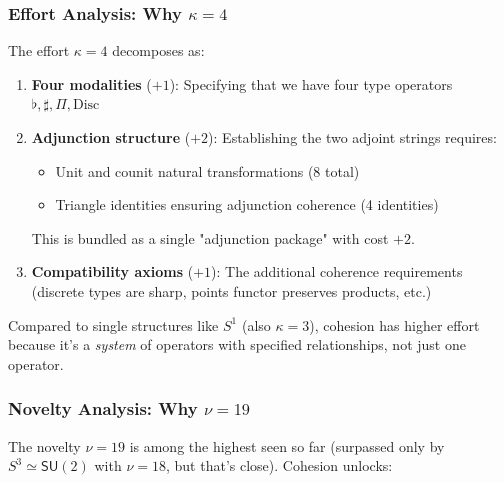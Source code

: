 \documentclass[11pt]{article}
\theoremstyle{definition}
\begin{document}
\subsubsection{Effort Analysis: Why $\kappa = 4$}

The effort $\kappa=4$ decomposes as:

\begin{enumerate}
\item \textbf{Four modalities} ($+1$): Specifying that we have four type operators $\flat, \sharp, \Pi, \text{Disc}$

\item \textbf{Adjunction structure} ($+2$): Establishing the two adjoint strings requires:
\begin{itemize}
\item Unit and counit natural transformations (8 total)
\item Triangle identities ensuring adjunction coherence (4 identities)
\end{itemize}
This is bundled as a single "adjunction package" with cost $+2$.

\item \textbf{Compatibility axioms} ($+1$): The additional coherence requirements (discrete types are sharp, points functor preserves products, etc.)
\end{enumerate}

Compared to single structures like $S^1$ (also $\kappa=3$), cohesion has higher effort because it's a \emph{system} of operators with specified relationships, not just one operator.

\subsubsection{Novelty Analysis: Why $\nu = 19$}

The novelty $\nu=19$ is among the highest seen so far (surpassed only by $S^3 \simeq \mathsf{SU}(2)$ with $\nu=18$, but that's close). Cohesion unlocks:
\end{document}
